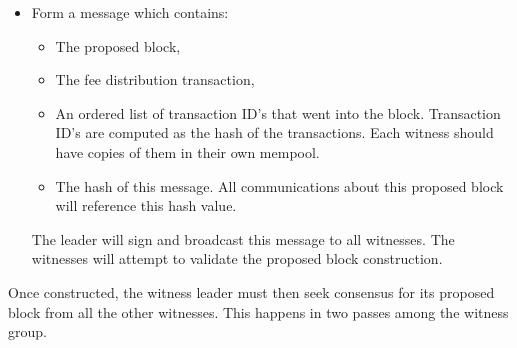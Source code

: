 \documentclass[a4paper, 10pt, conference]{ieeeconf}
\begin{document}
\begin{itemize}
\item{Form a message which contains:
\begin{itemize}
\item{The proposed block,}
\item{The fee distribution transaction,}
\item{An ordered list of transaction ID's that went into the block. Transaction ID's are computed as the hash of the transactions. Each witness should have copies of them in their own mempool.}
\item{The hash of this message. All communications about this proposed block will reference this hash value.}
\end{itemize}
The leader will sign and broadcast this message to all witnesses. The witnesses will attempt to validate the proposed block construction.}
\end{itemize}

Once constructed, the witness leader must then seek consensus for its proposed block from all the other witnesses. This happens in two passes among the witness group.
\end{document}
